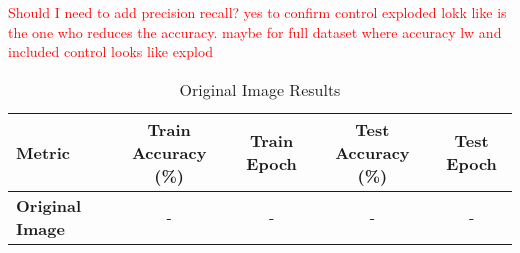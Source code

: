 \begin{table}[H]
    \centering
    \caption{Evaluation Results on Different Datasets and Augmentations with euclidean distance}
    \label{tab:evaluation_results_euclidean}
\end{table}

\textcolor{red}{Should I need to add precision recall? yes to confirm control exploded lokk like is the one who reduces the accuracy. maybe for full dataset where accuracy lw and included control looks like explod}

\begin{table}[H]
    \centering
    \caption{Original Image Results}
    \label{tab:original_image_results}
    \begin{tabular}{|l|c|c|c|c|}
    \hline
    \textbf{Metric}            & \textbf{Train Accuracy (\%)} & \textbf{Train Epoch} & \textbf{Test Accuracy (\%)} & \textbf{Test Epoch} \\ \hline
    \textbf{Original Image}    & -                      & -                    & -                        & -                   \\ \hline
    \end{tabular}
\end{table}




